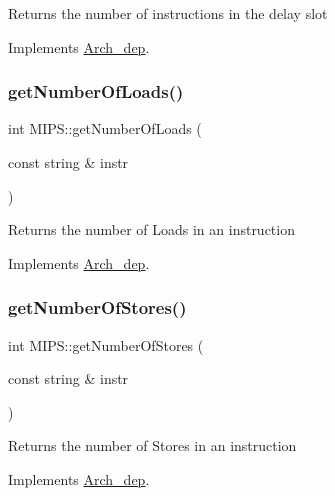 Returns the number of instructions in the delay slot 

Implements \hyperlink{classArch__dep_a7f9d441d7b402294c6faf7b81ee5aa59}{Arch\+\_\+dep}.

\mbox{\label{classMIPS_ad2447a7ac47005463a13e4e78dd55594}} 
\subsubsection{\texorpdfstring{get\+Number\+Of\+Loads()}{getNumberOfLoads()}}
{\footnotesize\ttfamily int M\+I\+P\+S\+::get\+Number\+Of\+Loads (\begin{DoxyParamCaption}\item[{const string \&}]{instr }\end{DoxyParamCaption})\hspace{0.3cm}{\ttfamily [virtual]}}

Returns the number of Loads in an instruction 

Implements \hyperlink{classArch__dep_a914556a124481b77698440f0cf6a5f24}{Arch\+\_\+dep}.

\mbox{\label{classMIPS_a8555188088fbf6dba02c37ca43e036c6}} 
\subsubsection{\texorpdfstring{get\+Number\+Of\+Stores()}{getNumberOfStores()}}
{\footnotesize\ttfamily int M\+I\+P\+S\+::get\+Number\+Of\+Stores (\begin{DoxyParamCaption}\item[{const string \&}]{instr }\end{DoxyParamCaption})\hspace{0.3cm}{\ttfamily [virtual]}}

Returns the number of Stores in an instruction 

Implements \hyperlink{classArch__dep_afd76af2d5947f461e8a04be6b45c2596}{Arch\+\_\+dep}.

\mbox{\label{classMIPS_a32b86b25f6547ba12fc2a8bc348b4aad}} 
